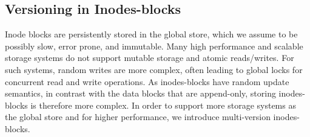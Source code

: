 \documentclass[]{article}
\newcommand{\subtopic}[1]{\vspace{1.5pt} \noindent \textbf{#1}}
\begin{document}
\newpage


\subsection{Versioning in Inodes-blocks}

%
%
%
%
%
%
%



Inode blocks are persistently stored in the global store, which we assume to be
possibly slow, error prone, and immutable. 
Many high performance and
scalable storage systems do not support mutable storage and atomic reads/writes. 
For such systems, random writes are more complex, often leading to
global locks for concurrent read and write operations. As inodes-blocks have
random update semantics, in contrast with the data blocks that are append-only,
storing inodes-blocks is therefore more complex.  In order to support more
storage systems as the global store and for higher performance, we introduce
multi-version inodes-blocks.


\end{document}
